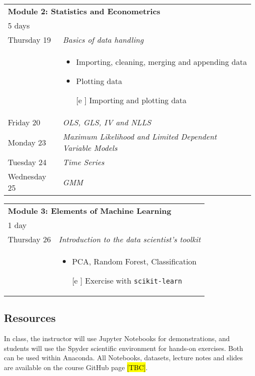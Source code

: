 \documentclass{amsart}
\theoremstyle{definition}
\theoremstyle{remark}
\numberwithin{equation}{section}
\begin{document}
\begin{center}
        \begin{tabular}{| p{3cm} | p{12cm} |}
    \hline
    \multicolumn{2}{|l|}{\textbf{Module 2: Statistics and Econometrics}} \\
    \multicolumn{2}{|l|}{5 days} \\
    \hline
    Thursday 19 & \textit{Basics of data handling} \\
        & \begin{itemize}
                \item Importing, cleaning, merging and appending data
                \item Plotting data
                \item [[e]] Importing and plotting data
            \end{itemize}
            \\
    Friday 20 & \textit{OLS, GLS, IV and NLLS}\\
    Monday 23 & \textit{Maximum Likelihood and Limited Dependent Variable Models}\\
    Tuesday 24 & \textit{Time Series}\\
    Wednesday 25 & \textit{GMM} \\
\hline
    \end{tabular}
\end{center}

\begin{center}
    \begin{tabular}{| p{3cm} | p{12cm} |}
    \hline
    \multicolumn{2}{|l|}{\textbf{Module 3: Elements of Machine Learning}} \\
    \multicolumn{2}{|l|}{1 day} \\
    \hline
    Thursday 26 & \textit{Introduction to the data scientist's toolkit} \\
        & \begin{itemize}
                \item PCA, Random Forest, Classification
                \item [[e]] Exercise with \texttt{scikit-learn}
            \end{itemize} \\
    \hline
    \end{tabular}

\end{center}

\begin{center}
    
\end{center}

\subsection*{Resources}

In class, the instructor will use Jupyter Notebooks for demonstrations, and students will use the Spyder scientific environment for hands-on exercises. Both can be used within Anaconda. All Notebooks, datasets, lecture notes and slides are available on the course GitHub page \hl{[TBC]}.

\newpage 



\end{document}
